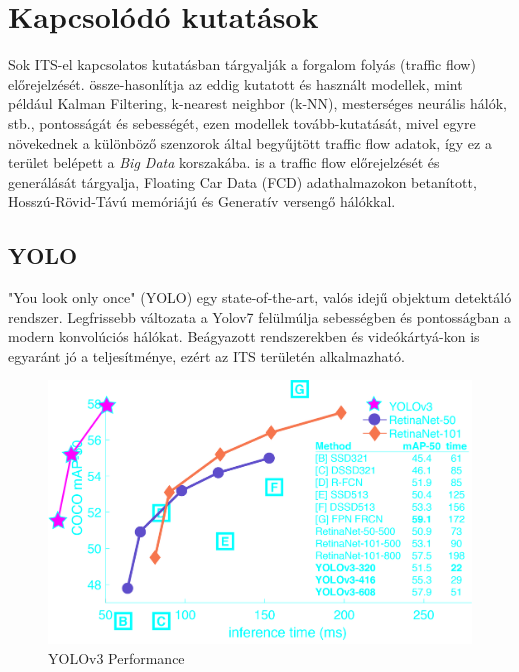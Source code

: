 \documentclass[acmtog, authorversion]{acmart}
\begin{document}
\section{Kapcsolódó kutatások}
Sok ITS-el kapcsolatos kutatásban tárgyalják a forgalom folyás (traffic flow) előrejelzését. \cite{PAUL2017177} össze-hasonlítja az eddig
kutatott és használt modellek, mint például Kalman Filtering, k-nearest neighbor (k-NN), mesterséges neurális hálók, stb., pontosságát és
sebességét, ezen modellek tovább-kutatását, mivel egyre növekednek a különböző szenzorok által  begyűjtött traffic flow adatok, így ez a terület belépett
a \emph{Big Data} korszakába. \cite{10.1371/journal.pone.0253868} is a traffic flow előrejelzését és generálását tárgyalja, Floating Car Data (FCD) 
adathalmazokon betanított, Hosszú-Rövid-Távú memóriájú és Generatív versengő hálókkal.
\subsection{YOLO}
"You look only once" (YOLO) egy state-of-the-art, valós idejű objektum detektáló rendszer. Legfrissebb változata a Yolov7 felülmúlja sebességben
és pontosságban a modern konvolúciós hálókat. Beágyazott rendszerekben és videókártyá-kon is egyaránt jó a teljesítménye, ezért az ITS területén
alkalmazható. 
\begin{figure}[H]
 \includegraphics[width=1\columnwidth]{yolov3_perf.png}
 \caption[YOLOv3]{YOLOv3 Performance}
 \label{fig: Yolov3chart}
\end{figure}
\end{document}
